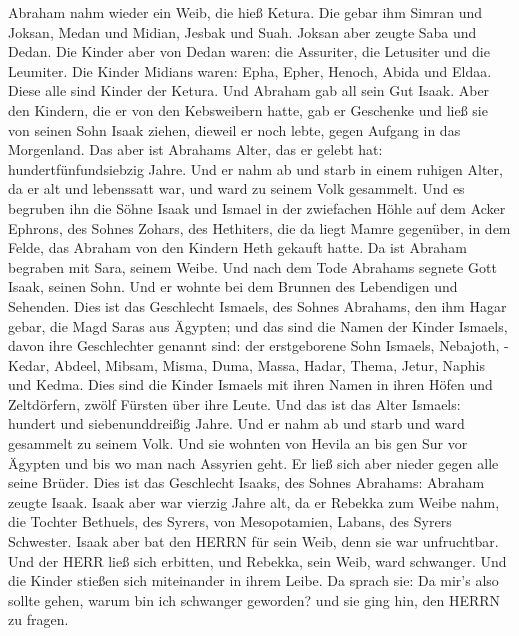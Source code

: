  Abraham nahm wieder ein Weib, die hieß Ketura. 
Die gebar ihm Simran und Joksan, Medan und Midian, Jesbak und Suah.
 Joksan aber zeugte Saba und Dedan. Die Kinder aber von
Dedan waren: die Assuriter, die Letusiter und die Leumiter. 
Die Kinder Midians waren: Epha, Epher, Henoch, Abida und Eldaa. Diese
alle sind Kinder der Ketura.  Und Abraham gab all sein Gut
Isaak.  Aber den Kindern, die er von den Kebsweibern hatte,
gab er Geschenke und ließ sie von seinen Sohn Isaak ziehen, dieweil er
noch lebte, gegen Aufgang in das Morgenland.  Das aber ist
Abrahams Alter, das er gelebt hat: hundertfünfundsiebzig Jahre.
 Und er nahm ab und starb in einem ruhigen Alter, da er alt
und lebenssatt war, und ward zu seinem Volk gesammelt.  Und
es begruben ihn die Söhne Isaak und Ismael in der zwiefachen Höhle auf
dem Acker Ephrons, des Sohnes Zohars, des Hethiters, die da liegt Mamre
gegenüber,  in dem Felde, das Abraham von den Kindern Heth
gekauft hatte. Da ist Abraham begraben mit Sara, seinem Weibe.
 Und nach dem Tode Abrahams segnete Gott Isaak, seinen
Sohn. Und er wohnte bei dem Brunnen des Lebendigen und Sehenden.
 Dies ist das Geschlecht Ismaels, des Sohnes Abrahams, den
ihm Hagar gebar, die Magd Saras aus Ägypten;  und das sind
die Namen der Kinder Ismaels, davon ihre Geschlechter genannt sind: der
erstgeborene Sohn Ismaels, Nebajoth, -Kedar, Abdeel, Mibsam,
 Misma, Duma, Massa,  Hadar, Thema, Jetur,
Naphis und Kedma.  Dies sind die Kinder Ismaels mit ihren
Namen in ihren Höfen und Zeltdörfern, zwölf Fürsten über ihre Leute.
 Und das ist das Alter Ismaels: hundert und
siebenunddreißig Jahre. Und er nahm ab und starb und ward gesammelt zu
seinem Volk.  Und sie wohnten von Hevila an bis gen Sur vor
Ägypten und bis wo man nach Assyrien geht. Er ließ sich aber nieder
gegen alle seine Brüder.  Dies ist das Geschlecht Isaaks,
des Sohnes Abrahams: Abraham zeugte Isaak.  Isaak aber war
vierzig Jahre alt, da er Rebekka zum Weibe nahm, die Tochter Bethuels,
des Syrers, von Mesopotamien, Labans, des Syrers Schwester.
 Isaak aber bat den HERRN für sein Weib, denn sie war
unfruchtbar. Und der HERR ließ sich erbitten, und Rebekka, sein Weib,
ward schwanger.  Und die Kinder stießen sich miteinander in
ihrem Leibe. Da sprach sie: Da mir's also sollte gehen, warum bin ich
schwanger geworden? und sie ging hin, den HERRN zu fragen. 
